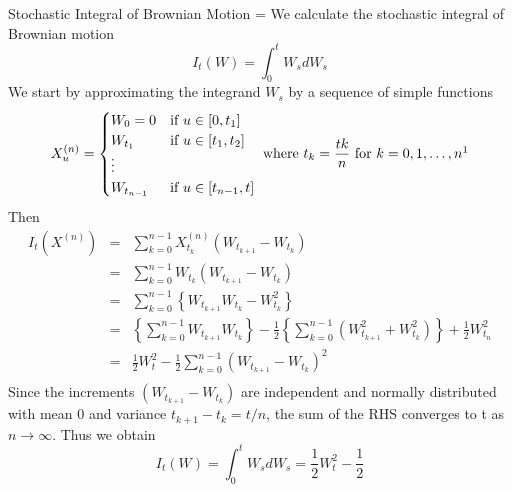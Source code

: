 \documentclass[11pt,a4paper]{article}
\begin{document}
    \begin{example}{Stochastic Integral of Brownian Motion}\label{ex_stochatic_integral_of_brownian_motion}
      \everymath={\displaystyle}
      We calculate the stochastic integral of Brownian motion
      \[ I_t(W)=\int_0^tW_sdW_s \]
      We start by approximating the integrand $W_s$ by a sequence of simple functions
      \[
        X_u^{(n)}=\begin{cases}
          W_0=0&\text{if }u\in[0,t_1]\\
          W_{t_1}&\text{if }u\in[t_1,t_2]\\
          \vdots\\
          W_{t_{n-1}}&\text{if }u\in[t_{n-1},t]
        \end{cases}\text{ where }t_k=\frac{tk}n\text{ for }k=0,1,\dots,n\footnotemark
       \]
       Then
       \[\begin{array}{rcl}
         I_t(X^{(n)})&=&\sum_{k=0}^{n-1}X_{t_k}^{(n)}(W_{t_{k+1}}-W_{t_k})\\
         &=&\sum_{k=0}^{n-1}W_{t_k}(W_{t_{k+1}}-W_{t_k})\\
         &=&\sum_{k=0}^{n-1}\left\{W_{t_{k+1}}W_{t_k}-W_{t_k}^2\right\}\\
         &=&\left\{\sum_{k=0}^{n-1}W_{t_{k+1}}W_{t_k}\right\}-\frac12\left\{\sum_{k=0}^{n-1}(W_{t_{k+1}}^2+W_{t_k}^2)\right\}+\frac12W_{t_n}^2\\
         &=&\frac12W_t^2-\frac12\sum_{k=0}^{n-1}(W_{t_{k+1}}-W_{t_k})^2\\
       \end{array}\]
       Since the increments $(W_{t_{k+1}}-W_{t_k})$ are independent and normally distributed with mean 0 and variance $t_{k+1}-t_k=t/n$, the sum of the RHS converges to t as $n\to\infty$. Thus we obtain
       \[ I_t(W)=\int_0^tW_sdW_s=\frac12W_t^2-\frac12 \]
    \end{example}
\end{document}

